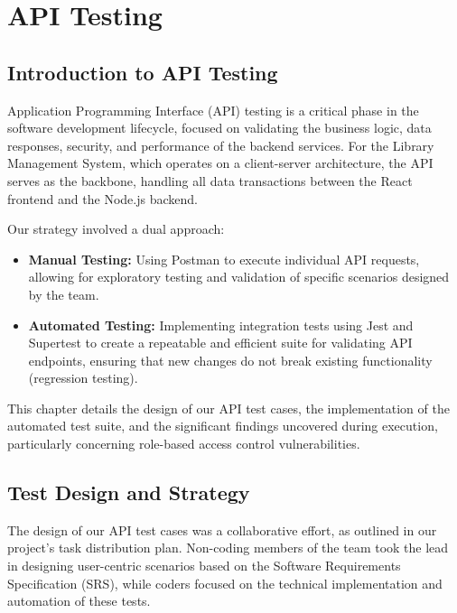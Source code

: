 \chapter{API Testing}
\label{chap:api_testing}

\section{Introduction to API Testing}
Application Programming Interface (API) testing is a critical phase in the software development lifecycle, focused on validating the business logic, data responses, security, and performance of the backend services. For the Library Management System, which operates on a client-server architecture, the API serves as the backbone, handling all data transactions between the React frontend and the Node.js backend. 

Our strategy involved a dual approach:
\begin{itemize}
    \item \textbf{Manual Testing:} Using Postman to execute individual API requests, allowing for exploratory testing and validation of specific scenarios designed by the team.
    \item \textbf{Automated Testing:} Implementing integration tests using Jest and Supertest to create a repeatable and efficient suite for validating API endpoints, ensuring that new changes do not break existing functionality (regression testing).
\end{itemize}

This chapter details the design of our API test cases, the implementation of the automated test suite, and the significant findings uncovered during execution, particularly concerning role-based access control vulnerabilities.

\section{Test Design and Strategy}
The design of our API test cases was a collaborative effort, as outlined in our project's task distribution plan.  Non-coding members of the team took the lead in designing user-centric scenarios based on the Software Requirements Specification (SRS), while coders focused on the technical implementation and automation of these tests. 

